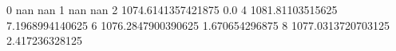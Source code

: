 0 nan nan
1 nan nan
2 1074.6141357421875 0.0
4 1081.81103515625 7.1968994140625
6 1076.2847900390625 1.670654296875
8 1077.0313720703125 2.417236328125
